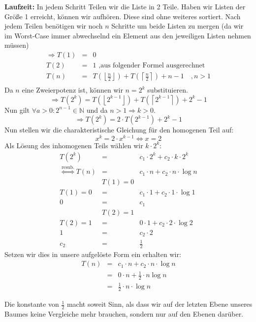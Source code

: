 \documentclass[11pt,a4paper,ngerman]{article}
\begin{document}
\begin{description}
\begin{description}
\item{\bfseries Laufzeit:} In jedem Schritt Teilen wir die Liste in 2 Teile. Haben wir Listen der Größe 1 erreicht, können wir aufhören. Diese sind ohne weiteres sortiert. Nach jedem Teilen benötigen wir noch $n$ Schritte um beide Listen zu mergen (da wir im Worst-Case immer abwechselnd ein Element aus den jeweiligen Listen nehmen müssen)
$$
\begin{array}{rcl}
\Rightarrow T(1) &=& 0  \\
T(2) &=& 1 \text{ ,aus folgender Formel ausgerechnet}\\
T(n) &=& T(\left\lfloor \frac{n}{2} \right\rfloor)+ T(\left\lceil \frac{n}{2} \right\rceil) + n - 1 \quad , n>1\\
\end{array}
$$
Da $n$ eine Zweierpotenz ist, können wir $n = 2^k$ substituieren.
$$\Rightarrow T(2^k) = T\left(\left\lfloor 2^{k-1} \right\rfloor\right)+ T(\left\lceil 2^{k-1} \right\rceil) + 2^k - 1$$
Nun gilt $\forall a > 0 : 2^{n-1} \in \mathbb{N} $ und da $n>1 \Rightarrow k>0$.
$$\Rightarrow T(2^k) = 2\cdot T(2^{k-1}) + 2^k -1$$
Nun stellen wir die charakteristische Gleichung für den homogenen Teil auf:
$$x^k = 2\cdot x^{k-1} \Leftrightarrow x = 2$$
Als Lösung des inhomogenen Teils wählen wir $k \cdot 2^k$:
$$
\begin{array}{rcl}
T(2^k) &=& c_1 \cdot 2^k + c_2 \cdot k \cdot 2^k\\
\stackrel{\text{resub.}}{\Leftrightarrow} T(n) &=& c_1 \cdot n + c_2 \cdot n \cdot \log n\\
&T(1) = 0&\\
T(1) = 0 &=& c_1 \cdot 1 + c_2 \cdot 1 \cdot \log 1\\
0&=&c_1\\
&T(2) = 1&\\
T(2) = 1 &=& 0 \cdot 1 + c_2 \cdot 2 \cdot \log 2\\
1&=&c_2 \cdot 2\\
c_2 &=& \frac{1}{2} 
\end{array}
$$
Setzen wir dies in unsere aufgelöste Form ein erhalten wir:
$$
\begin{array}{rcl}
T(n) &=& c_1 \cdot n + c_2 \cdot n \cdot \log n\\ &=& 0 \cdot n + \frac{1}{2} \cdot n \log n \\ &=& \frac{1}{2} \cdot n \cdot \log n 
\end{array}
$$

\end{description}

Die konstante von $\frac{1}{2}$ macht soweit Sinn, als dass wir auf der letzten Ebene unseres Baumes keine Vergleiche mehr brauchen, sondern nur auf den Ebenen darüber.

\end{description}
\end{document}
